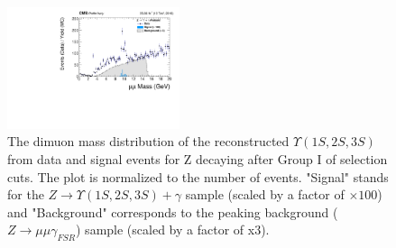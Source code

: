 \begin{figure}[!htbp]
\begin{center}
\includegraphics[width=0.45\textwidth]{figures/outputPlots/ZtoUpsilon_Cat0_ZZZZZ/nEvts/data_x_mc/noKinCuts/h_noKin_Upsilon_Mass_Signal_and_Background_LargeRange}\hspace*{1.cm}
\end{center}\vspace*{-.5cm}
\caption{The dimuon mass distribution of the reconstructed $\Upsilon (1S,2S,3S)$ from data and signal events for Z decaying after Group I of selection cuts. The plot is normalized to the number of events. "Signal" stands for the $Z \rightarrow \Upsilon (1S,2S,3S) + \gamma$ sample (scaled by a factor of $\times 100$) and "Background" corresponds to the peaking background ($Z \rightarrow \mu\mu\gamma_{FSR}$) sample (scaled by a factor of x3).}
\label{fig:dimuon_mass_ZtoUpsilon_Cat0}
\end{figure}




